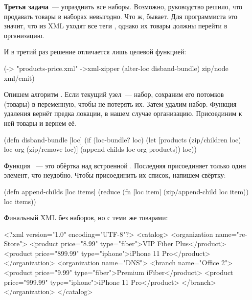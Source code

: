 \textbf{Третья задача}~--- упразднить все наборы. Возможно, руководство решило, что
продавать товары в наборах невыгодно. Что ж, бывает. Для программиста это
значит, что из XML уходят все теги , однако их товары должны перейти в
организацию.

И в третий раз решение отличается лишь целевой функцией:

\begin{english}
  \begin{clojure}
(-> "products-price.xml"
    ->xml-zipper
    (alter-loc disband-bundle)
    zip/node
    xml/emit)
  \end{clojure}
\end{english}

Опишем алгоритм . Если текущий узел~--- набор, сохраним его
потомков (товары) в переменную, чтобы не потерять их. Затем удалим
набор. Функция удаления вернёт предка локации, в нашем случае
организацию. Присоединим к ней товары и вернем её.

\begin{english}
  \begin{clojure}
(defn disband-bundle [loc]
  (if (loc-bundle? loc)
    (let [products (zip/children loc)
          loc-org (zip/remove loc)]
      (append-childs loc-org products))
    loc))
  \end{clojure}
\end{english}

Функция ~--- это обёртка над встроенной
. Последняя присоединяет только один элемент, что
неудобно. Чтобы присоединить их список, напишем свёртку:

\begin{english}
  \begin{clojure}
(defn append-childs [loc items]
  (reduce (fn [loc item]
            (zip/append-child loc item))
          loc
          items))
  \end{clojure}
\end{english}

Финальный XML без наборов, но с теми же товарами:

\begin{english}
  \begin{xml}
<?xml version="1.0" encoding="UTF-8"?>
<catalog>
  <organization name="re-Store">
    <product price="8.99" type="fiber">VIP Fiber Plus</product>
    <product price="899.99" type="iphone">iPhone 11 Pro</product>
  </organization>
  <organization name="DNS">
    <branch name="Office 2">
      <product price="9.99" type="fiber">Premium iFiber</product>
      <product price="999.99" type="iphone">iPhone 11 Pro</product>
    </branch>
  </organization>
</catalog>
  \end{xml}
\end{english}

